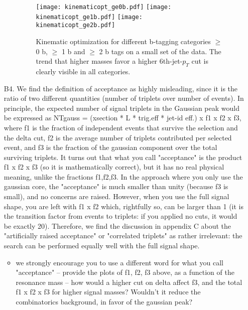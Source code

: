 \documentclass[paper=a4, fontsize=11pt]{scrartcl}
\begin{document}
\begin{itemize}
\begin{itemize}
\begin{figure}[ht]
 \begin{center}
 \hfill
 \texttt{[image: kinematicopt\_ge0b.pdf]}
 \texttt{[image: kinematicopt\_ge1b.pdf]}
  \texttt{[image: kinematicopt\_ge2b.pdf]}
         \caption{
         Kinematic optimization for different b-tagging categories  $\geq$ 0 b, $\geq$ 1 b and $\geq$ 2 b tags on a small set of the data. The trend that higher masses favor a higher 6th-jet-$p_T$ cut is clearly visible in all categories.}
   \label{fig:optimization}
 \end{center}
\end{figure}

\end{itemize}

\item[B4.] We find the definition of acceptance as highly misleading, since it is the ratio of two different quantities (number of triplets over number of events). In principle, the expected number of signal triplets in the Gaussian peak would be expressed as NTgauss = (xsection * L * trig.eff * jet-id eff.) x f1 x f2 x f3, where f1 is the fraction of independent events that survive the selection and the delta cut, f2 is the average number of triplets contributed per selected event, and f3 is the fraction of the gaussian component over the total surviving triplets. It turns out that what you call "acceptance" is the product f1 x f2 x f3 (so it is mathematically correct), but it has no real physical meaning, unlike the fractions f1,f2,f3. In the approach where you only use the gaussian core, the "acceptance" is much smaller than unity (because f3 is small), and no
concerns are raised. However, when you use the full signal shape, you are left with f1 x f2 which, rightfully so, can be larger than 1 (it is the transition factor from events to triplets: if you applied no cuts, it would be exactly 20). Therefore, we find the discussion in appendix C about the "artificially raised acceptance" or "correlated triplets" as rather irrelevant: the search can be performed equally well with the full signal shape.
\begin{itemize}
\item we strongly encourage you to use a different word for what you call "acceptance" -- provide the plots of f1, f2, f3 above, as a function of the resonance mass -- how would a higher cut on delta affect f3, and the total f1 x f2 x f3 for higher signal masses? Wouldn't it reduce the combinatorics background, in favor of the gaussian peak?


\end{itemize}
\end{itemize}
\end{document}
